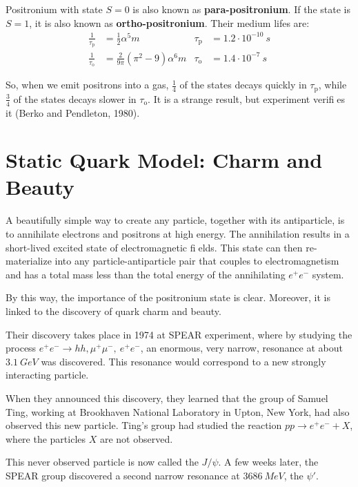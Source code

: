 \documentclass[../../main/main.tex]{subfiles}
\begin{document}
Positronium with state \( S = 0 \) is also known as \textbf{para-positronium}. If the state is \( S = 1 \), it is also known as \textbf{ortho-positronium}. Their medium lifes are:
\begin{align}
    \frac{1}{\tau_\mathrm{p}} &= \frac{1}{2} \alpha^5 m &   \tau_\mathrm{p} &= 1.2 \cdot 10^{-10} \ \si{s}  \\
    \frac{1}{\tau_\mathrm{o}} &= \frac{2}{9\pi} (\pi^2 - 9) \alpha^6 m &   \tau_\mathrm{o} &= 1.4 \cdot 10^{-7} \ \si{s}
\end{align}

So, when we emit positrons into a gas, \( \frac{1}{4} \) of the states decays quickly in \( \tau_\mathrm{p} \), while \( \frac{3}{4} \) of the states decays slower in \( \tau_\mathrm{o} \). It is a strange result, but experiment verifies it (Berko and Pendleton, 1980).





\section{Static Quark Model: Charm and Beauty}
A beautifully simple way to create any particle, together with its antiparticle, is to annihilate electrons and positrons at high energy. The annihilation results in a short-lived excited state of electromagnetic fields. This state can then re-materialize into any particle-antiparticle pair that couples to electromagnetism and has a total mass less than the total energy of the annihilating  \( e^+ e^- \) system.

By this way, the importance of the positronium state is clear. Moreover, it is linked to the discovery of quark charm and beauty.

Their discovery takes place in 1974 at SPEAR experiment, where by studying the process \( e^+ e^- \longrightarrow hh, \mu^+\mu^-, \ e^+e^- \), an enormous, very narrow, resonance at about \( \SI{3.1}{GeV} \) was discovered. This resonance would correspond to a new strongly interacting particle.

When they announced this discovery, they learned that the group of Samuel Ting, working at Brookhaven National Laboratory in Upton, New York, had also observed this new particle. Ting's group had studied the reaction \( pp \longrightarrow e^+e^- + X \), where the particles \( X \) are not observed.

This never observed particle is now called the \( J/\psi \). A few weeks later, the SPEAR group discovered a second narrow resonance at \( \SI{3686}{MeV} \), the \( \psi' \).
\end{document}
